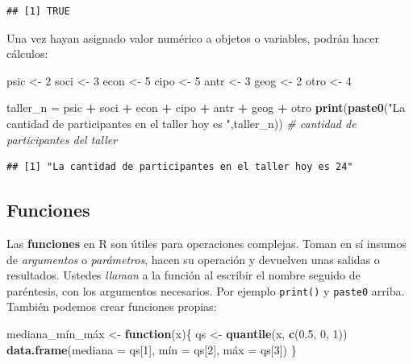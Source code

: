 \documentclass[
]{article}
\newenvironment{Shaded}{\begin{snugshade}}{\end{snugshade}}
\newcommand{\AttributeTok}[1]{\textcolor[rgb]{0.13,0.29,0.53}{#1}}
\newcommand{\CommentTok}[1]{\textcolor[rgb]{0.56,0.35,0.01}{\textit{#1}}}
\newcommand{\ControlFlowTok}[1]{\textcolor[rgb]{0.13,0.29,0.53}{\textbf{#1}}}
\newcommand{\DecValTok}[1]{\textcolor[rgb]{0.00,0.00,0.81}{#1}}
\newcommand{\FloatTok}[1]{\textcolor[rgb]{0.00,0.00,0.81}{#1}}
\newcommand{\FunctionTok}[1]{\textcolor[rgb]{0.13,0.29,0.53}{\textbf{#1}}}
\newcommand{\NormalTok}[1]{#1}
\newcommand{\OtherTok}[1]{\textcolor[rgb]{0.56,0.35,0.01}{#1}}
\newcommand{\SpecialCharTok}[1]{\textcolor[rgb]{0.81,0.36,0.00}{\textbf{#1}}}
\newcommand{\StringTok}[1]{\textcolor[rgb]{0.31,0.60,0.02}{#1}}
\begin{document}
\begin{verbatim}
## [1] TRUE
\end{verbatim}

Una vez hayan asignado valor numérico a objetos o variables, podrán
hacer cálculos:

\begin{Shaded}
\begin{Highlighting}[]
\NormalTok{psic }\OtherTok{\textless{}{-}} \DecValTok{2}
\NormalTok{soci }\OtherTok{\textless{}{-}} \DecValTok{3}
\NormalTok{econ }\OtherTok{\textless{}{-}} \DecValTok{5}
\NormalTok{cipo }\OtherTok{\textless{}{-}} \DecValTok{5}
\NormalTok{antr }\OtherTok{\textless{}{-}} \DecValTok{3}
\NormalTok{geog }\OtherTok{\textless{}{-}} \DecValTok{2}
\NormalTok{otro }\OtherTok{\textless{}{-}} \DecValTok{4}

\NormalTok{taller\_n }\OtherTok{=}\NormalTok{ psic }\SpecialCharTok{+}\NormalTok{ soci }\SpecialCharTok{+}\NormalTok{ econ }\SpecialCharTok{+}\NormalTok{ cipo }\SpecialCharTok{+}\NormalTok{ antr }\SpecialCharTok{+}\NormalTok{ geog }\SpecialCharTok{+}\NormalTok{ otro }
\FunctionTok{print}\NormalTok{(}\FunctionTok{paste0}\NormalTok{(}\StringTok{"La cantidad de participantes en el taller hoy es "}\NormalTok{,taller\_n)) }\CommentTok{\# cantidad de participantes del taller}
\end{Highlighting}
\end{Shaded}

\begin{verbatim}
## [1] "La cantidad de participantes en el taller hoy es 24"
\end{verbatim}

\subsection{Funciones}\label{funciones}

Las \textbf{funciones} en R son útiles para operaciones complejas. Toman
en sí insumos de \emph{argumentos} o \emph{parámetros}, hacen su
operación y devuelven unas salidas o resultados. Ustedes \emph{llaman} a
la función al escribir el nombre seguido de paréntesis, con los
argumentos necesarios. Por ejemplo \texttt{print()} y \texttt{paste0}
arriba. También podemos crear funciones propias:

\begin{Shaded}
\begin{Highlighting}[]
\NormalTok{mediana\_mín\_máx }\OtherTok{\textless{}{-}} \ControlFlowTok{function}\NormalTok{(x)\{}
\NormalTok{  qs }\OtherTok{\textless{}{-}} \FunctionTok{quantile}\NormalTok{(x, }\FunctionTok{c}\NormalTok{(}\FloatTok{0.5}\NormalTok{, }\DecValTok{0}\NormalTok{, }\DecValTok{1}\NormalTok{))}
  \FunctionTok{data.frame}\NormalTok{(}\AttributeTok{mediana =}\NormalTok{ qs[}\DecValTok{1}\NormalTok{], mín }\OtherTok{=}\NormalTok{ qs[}\DecValTok{2}\NormalTok{], máx }\OtherTok{=}\NormalTok{ qs[}\DecValTok{3}\NormalTok{])}
\NormalTok{\}}
\end{Highlighting}
\end{Shaded}
\end{document}
